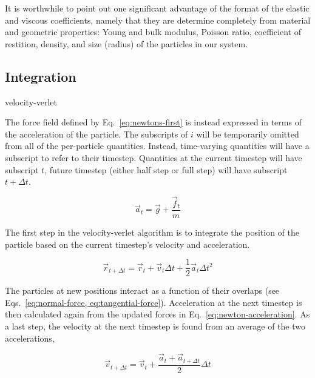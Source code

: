 It is worthwhile to point out one significant advantage of the format of the elastic and viscous coefficients, namely that they are determine completely from material and geometric properties: Young and bulk modulus, Poisson ratio, coefficient of restition, density, and size (radius) of the particles in our system.




\subsection{Integration}
velocity-verlet

The force field defined by Eq.~\ref{eq:newtons-first} is instead expressed in terms of the acceleration of the particle. The subscripts of $i$ will be temporarily omitted from all of the per-particle quantities. Instead, time-varying quantities will have a subscript to refer to their timestep. Quantities at the current timestep will have subscript $t$, future timestep (either half step or full step) will have subscript $t+\Delta t$.

\begin{equation}\label{eq:newton-acceleration}
	\vec{a}_t = \vec{g} + \frac{\vec{f}_t}{m}
\end{equation}

The first step in the velocity-verlet algorithm is to integrate the position of the particle based on the current timestep's velocity and acceleration.

\begin{equation}
	\vec{r}_{t+\Delta t} = \vec{r}_t + \vec{v}_t\Delta t + \frac{1}{2}\vec{a}_t\Delta t^2
\end{equation}

The particles at new positions interact as a function of their overlaps (see Eqs.~\ref{eq:normal-force, eq:tangential-force}). Acceleration at the next timestep is then calculated again from the updated forces in Eq.~\ref{eq:newton-acceleration}. As a last step, the velocity at the next timestep is found from an average of the two accelerations,

\begin{equation}
	\vec{v}_{t+\Delta t} = \vec{v}_t + \frac{\vec{a}_t + \vec{a}_{t+\Delta t}}{2}\Delta t
\end{equation}



